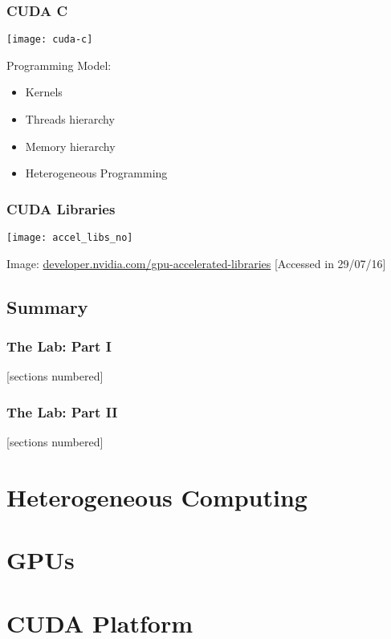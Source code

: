 \documentclass[10pt, compress]{beamer}
\begin{document}
\begin{frame}
    \frametitle{CUDA C}
    \begin{center}
        \texttt{[image: cuda-c]}
    \end{center}

    Programming Model:

    \begin{itemize}
        \item \alert{Kernels}
        \item \alert{Threads} hierarchy
        \item \alert{Memory} hierarchy
        \item \alert{Heterogeneous} Programming
    \end{itemize}
\end{frame}

\begin{frame}
    \frametitle{CUDA Libraries}
    \centering
    \texttt{[image: accel\_libs\_no]}
    \vfill

    \tiny{Image: \url{developer.nvidia.com/gpu-accelerated-libraries} [Accessed in 29/07/16]}
\end{frame}

\subsection{Summary}

\begin{frame}
    \frametitle{The Lab: Part I}
    [sections numbered]
    \tableofcontents[hideallsubsections, part=1]
\end{frame}

\begin{frame}
    \frametitle{The Lab: Part II}
    [sections numbered]
    \tableofcontents[hideallsubsections, part=2]
\end{frame}

\section{Heterogeneous Computing}

\section{GPUs}

\section{CUDA Platform}
\end{document}

